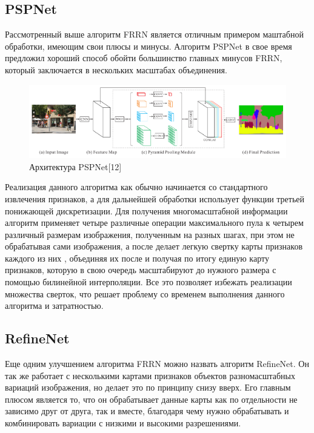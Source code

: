 \documentclass[bachelor, och, coursework]{shiza}
\begin{document}
\subsection{PSPNet}

Рассмотренный выше алгоритм FRRN является отличным примером маштабной обработки, имеющим свои плюсы и минусы. Алгоритм PSPNet в свое время предложил хороший 
способ обойти большинство главных минусов FRRN, который заключается в нескольких масштабах объединения. 

\begin{figure}[H]
    \centering
    \includegraphics[width=1\textwidth]{12}
    \caption{Архитектура PSPNet[12]}
    \label{fig:img1}
\end{figure}

Реализация данного алгоритма как обычно начинается со стандартного извлечения признаков, а для дальнейшей обработки использует функции третьей понижающей 
дискретизации. Для получения многомасштабной информации алгоритм применяет четыре различные операции максимального пула к четырем различный размерам изображения, 
полученным на разных шагах, при этом не обрабатывая сами изображения, а после делает легкую свертку карты признаков каждого из них , объединяя их после и получая 
по итогу единую карту признаков, которую в свою очередь масштабируют до нужного размера с помощью билинейной интерполяции. Все это позволяет избежать реализации 
множества сверток, что решает проблему со временем выполнения данного алгоритма и затратностью.

\subsection{RefineNet}

Еще одним улучшением алгоритма FRRN можно назвать алгоритм RefineNet. Он так же работает с несколькими картами признаков объектов разномасштабных вариаций изображения, 
но делает это по принципу снизу вверх. Его главным плюсом является то, что он обрабатывает данные карты как по отдельности не зависимо друг от друга, так и вместе, благодаря
чему нужно обрабатывать и комбинировать вариации с низкими и высокими разрешениями.
\end{document}

